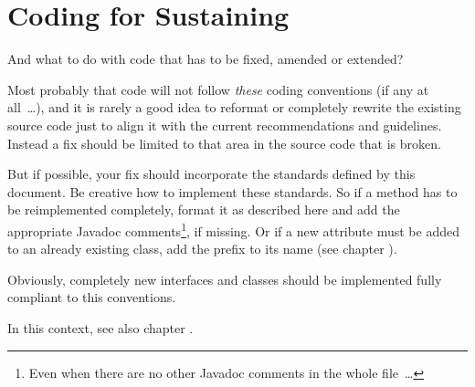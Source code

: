 \section{Coding for Sustaining}\label{sec:CodingForSustaining}
And what to do with  code that has to be fixed, amended or extended? 

Most probably that code will not follow \textit{these} coding conventions (if any at all~…), and it is rarely a good idea to reformat or completely rewrite the existing source code just to align it with the current recommendations and guidelines. Instead a fix should be limited to that area in the source code that is broken.

But if possible, your fix should incorporate the standards defined by this document. Be creative how to implement these standards. So if a method has to be reimplemented completely, format it as described here and add the appropriate Javadoc comments\footnote{Even when there are no other Javadoc comments in the whole file~…}, if missing. Or if a new attribute must be added to an already existing class, add the  prefix to its name (see chapter ).

Obviously, completely new interfaces and classes should be implemented fully compliant to this conventions.

In this context, see also chapter .

